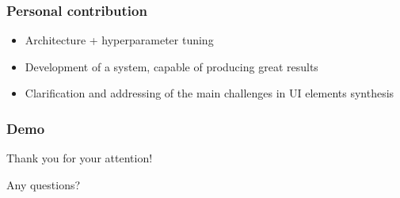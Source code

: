 \documentclass{beamer}
\begin{document}
\begin{frame}
\frametitle{Personal contribution}
\begin{itemize}
\item Architecture + hyperparameter tuning
\item Development of a system, capable of producing great results
\item Clarification and addressing of the main challenges in UI elements synthesis
\end{itemize}
\end{frame}

\begin{frame}
	\frametitle{Demo}
\end{frame}


\begin{frame}
\centerline{\Huge Thank you for your attention!}
\centerline{\huge Any questions?}
\end{frame}
\end{document}
